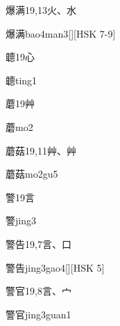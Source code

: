 \begin{Entry}{爆满}{19,13}{⽕、⽔}
  \begin{Phonetics}{爆满}{bao4man3}[][HSK 7-9]
  \end{Phonetics}
\end{Entry}

\begin{Entry}{聼}{19}{⼼}
  \begin{Phonetics}{聼}{ting1}
  \end{Phonetics}
\end{Entry}

\begin{Entry}{蘑}{19}{⾋}
  \begin{Phonetics}{蘑}{mo2}
  \end{Phonetics}
\end{Entry}

\begin{Entry}{蘑菇}{19,11}{⾋、⾋}
  \begin{Phonetics}{蘑菇}{mo2gu5}
  \end{Phonetics}
\end{Entry}

\begin{Entry}{警}{19}{⾔}
  \begin{Phonetics}{警}{jing3}
  \end{Phonetics}
\end{Entry}

\begin{Entry}{警告}{19,7}{⾔、⼝}
  \begin{Phonetics}{警告}{jing3gao4}[][HSK 5]
  \end{Phonetics}
\end{Entry}

\begin{Entry}{警官}{19,8}{⾔、⼧}
  \begin{Phonetics}{警官}{jing3guan1}
  \end{Phonetics}
\end{Entry}

